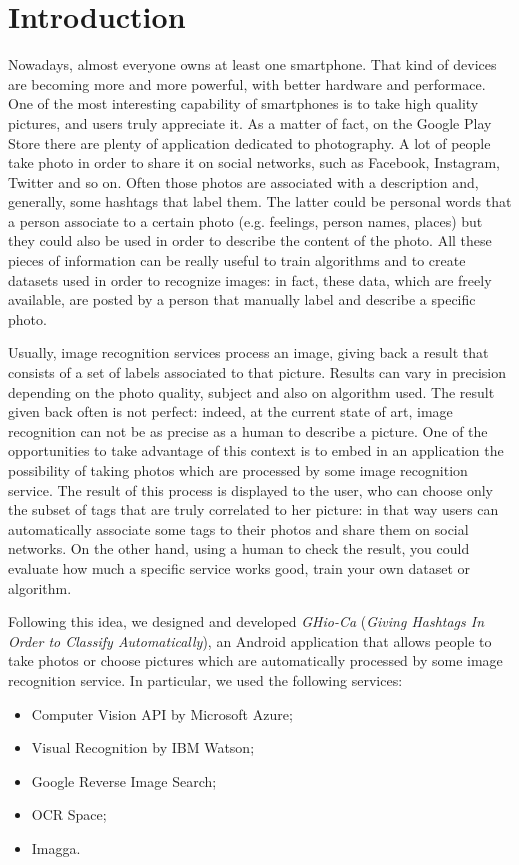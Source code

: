 \section{Introduction}
\label{sec:introduction}

Nowadays, almost everyone owns at least one smartphone. That kind of devices are 
becoming more and more powerful, with better hardware and performace. One of the 
most interesting capability of smartphones is to take high quality pictures, and 
users truly appreciate it. As a matter of fact, on the Google Play Store there 
are plenty of application dedicated to photography.
A lot of people take photo in order to share it on social networks, such as 
Facebook, Instagram, Twitter and so on. Often those photos are associated with a 
description and, generally, some hashtags that label them. The latter could be 
personal words that a person associate to a certain photo (e.g. feelings, person 
names, places) but they could also be used in order to describe the content of 
the photo.
All these pieces of information can be really useful to train algorithms and to 
create datasets used in order to recognize images: in fact, these data, which 
are freely available, are posted by a person that manually label and describe a 
specific photo.

Usually, image recognition services process an image, giving back a result that 
consists of a set of labels associated to that picture. Results can vary in precision 
depending on the photo quality, subject and also on algorithm used. 
The result given back often is not perfect: indeed, at the current state of art, image 
recognition can not be as precise as a human to describe a picture.
One of the opportunities to take advantage of this context is to embed in an application 
the possibility of taking photos which are processed by some image 
recognition service. The result of this process is displayed to the user, 
who can choose only the subset of tags that are truly correlated to her 
picture: in that way users can automatically associate some tags to their photos 
and share them on social networks. On the other hand, using a human to check the 
result, you could evaluate how much a specific service works good, train your own 
dataset or algorithm.

Following this idea, we designed and developed \textit{GHio-Ca} (\textit{Giving 
Hashtags In Order to Classify Automatically}), an Android application that 
allows people to take photos or choose pictures which are automatically 
processed by some image recognition service. In particular, we used the 
following services:
\begin{itemize}
  \item Computer Vision API by Microsoft Azure\cite{Microsoft};
  \item Visual Recognition by IBM Watson\cite{IBM};
  \item Google Reverse Image Search\cite{Google};
  \item OCR Space\cite{OCR};
  \item Imagga\cite{Imagga}.
\end{itemize}


